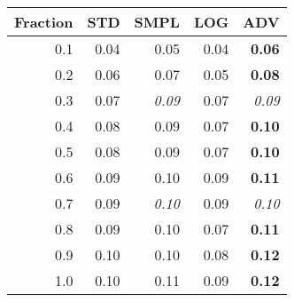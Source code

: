 \documentclass{standalone}
\begin{document}
\begin{tabular}{r|rrrr}
      \toprule
      Fraction & STD & SMPL & LOG & ADV\\
      \midrule
      0.1 & 0.04 & 0.05 & 0.04 & \textbf{0.06}\\
  0.2 & 0.06 & 0.07 & 0.05 & \textbf{0.08}\\
  0.3 & 0.07 & \emph{0.09} & 0.07 & \emph{0.09}\\
  0.4 & 0.08 & 0.09 & 0.07 & \textbf{0.10}\\
  0.5 & 0.08 & 0.09 & 0.07 & \textbf{0.10}\\
  0.6 & 0.09 & 0.10 & 0.09 & \textbf{0.11}\\
  0.7 & 0.09 & \emph{0.10} & 0.09 & \emph{0.10}\\
  0.8 & 0.09 & 0.10 & 0.07 & \textbf{0.11}\\
  0.9 & 0.10 & 0.10 & 0.08 & \textbf{0.12}\\
  1.0 & 0.10 & 0.11 & 0.09 & \textbf{0.12}\\
  \bottomrule
\end{tabular}
\end{document}
